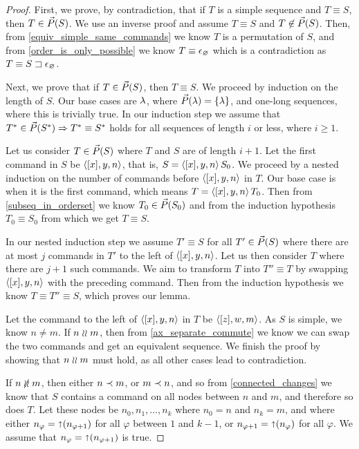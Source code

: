 \begin{proof}
First, we prove, by contradiction, that if $T$ is a simple sequence and $T\equiv S$, then $T\in\vec{P}({S})$.
We use an inverse proof and assume $T\equiv S$ and $T\not\in\vec{P}({S})$.
Then, from \cref{equiv_simple_same_commands} we know $T$ is a permutation of $S$,
and from \cref{order_is_only_possible} we know $T\equiv\epsilon_\varnothing$ which
is a contradiction as $T\equiv {S}\sqsupset\epsilon_\varnothing$.

Next, we prove that if $T\in\vec{P}({S})$, then $T\equiv S$.
We proceed by induction on the length of $S$.
Our base cases are $\lambda$, where $\vec{P}({\lambda})=\{\lambda\}$,
and one-long sequences, where this is trivially true.
In our induction step we assume that $T^*\in\vec{P}({S^*})\Rightarrow T^*\equiv S^*$ holds
for all sequences of length $i$ or less, where $i\geq 1$.

Let us consider $T\in\vec{P}({S})$ where $T$ and $S$ are of length $i+1$.
Let the first command in $S$ be $\langle{[x],y,n}\rangle$, that is, $S=\langle{[x],y,n}\rangle\, S_0$.
We proceed by a nested induction on the number of commands before $\langle{[x],y,n}\rangle$ in $T$.
Our base case is when it is the first command, which means $T=\langle{[x],y,n}\rangle\, T_0$.
Then from \cref{subseq_in_orderset} we know $T_0\in\vec{P}({S_0})$
and from the induction hypothesis $T_0\equiv S_0$ from which we get $T\equiv S$.

In our nested induction step we assume $T'\equiv S$ for all $T'\in\vec{P}({S})$
where there are at most $j$ commands in $T'$ to the left of $\langle{[x],y,n}\rangle$.
Let us then consider $T$ where there are $j+1$ such commands.
We aim to transform $T$ into $T''\equiv T$ by swapping $\langle{[x],y,n}\rangle$ with the preceding
command. Then from the induction hypothesis we know $T\equiv T''\equiv S$,
which proves our lemma.

Let the command to the left of $\langle{[x],y,n}\rangle$ in $T$ be $\langle{[z],w,m}\rangle$.
As $S$ is simple, we know $n\neq m$.
If $n\mathrel{\wr\wr} m$, then from \cref{ax_separate_commute} we know we can swap the two commands
and get an equivalent sequence.
We finish the proof by showing that $n\mathrel{\wr\wr} m$ must hold, as
all other cases lead to contradiction.

\newcommand{\indx}{\varphi}
If $n\nunrel m$, then either $n\prec m$, or $m\prec n$, and so from
\cref{connected_changes} we know that $S$ contains a command on all nodes
between $n$ and $m$, and therefore so does $T$.
Let these nodes be $n_0, n_1, \ldots, n_k$ where $n_0=n$ and $n_k=m$,
and where 
either $n_\indx=\parentf{n_{\indx+1}}$ for all $\indx$ between $1$ and $k-1$,
or $n_{\indx+1}=\parentf{n_\indx}$ for all $\indx$.
We assume that $n_\indx=\parentf{n_{\indx+1}}$ is true.


\end{proof}
